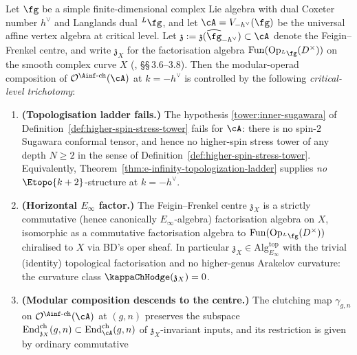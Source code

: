 \begin{theorem}
\label{thm:ff-chirhoch-critical}
Let $\fg$ be a simple finite-dimensional complex Lie algebra with
dual Coxeter number $h^\vee$ and Langlands dual ${}^L\fg$, and let
$\cA = V_{-h^\vee}(\fg)$ be the universal affine vertex algebra at
critical level. Let $\mathfrak{z} :=
\mathfrak{z}(\widehat{\fg}_{-h^\vee})
\subset \cA$ denote the Feigin--Frenkel centre, and write
$\mathfrak{z}_X$ for the factorisation algebra
$\mathrm{Fun}(\mathrm{Op}_{{}^L\fg}(D^\times))$ on the
smooth complex curve $X$ (\cite{BD04}, \S\S\,3.6--3.8). Then the
modular-operad composition of
$\mathcal{O}^{\Ainf\text{-ch}}(\cA)$ at $k=-h^\vee$ is controlled by
the following \emph{critical-level trichotomy}:
\begin{enumerate}[label=\textup{(\roman*)}]
\item \textbf{(Topologisation ladder fails.)} The hypothesis
 \ref{tower:inner-sugawara} of
 Definition~\ref{def:higher-spin-stress-tower} fails for $\cA$:
 there is no spin-$2$ Sugawara conformal tensor, and hence no
 higher-spin stress tower of any depth $N \ge 2$ in the sense of
 Definition~\ref{def:higher-spin-stress-tower}. Equivalently,
 Theorem~\ref{thm:e-infinity-topologization-ladder} supplies
 \emph{no} $\Etopo{k+2}$-structure at $k=-h^\vee$.
\item \textbf{(Horizontal $E_\infty$ factor.)} The Feigin--Frenkel
 centre $\mathfrak{z}_X$ is a strictly commutative (hence canonically
 $E_\infty$-algebra) factorisation algebra on $X$, isomorphic as a
 commutative factorisation algebra to
 $\mathrm{Fun}(\mathrm{Op}_{{}^L\fg}(D^\times))$ chiralised to $X$
 via BD's oper sheaf. In particular
 $\mathfrak{z}_X \in \mathrm{Alg}_{E_\infty}^{\mathrm{top}}$ with
 the trivial (identity) topological factorisation and no
 higher-genus Arakelov curvature: the curvature class
 $\kappaChHodge(\mathfrak{z}_X) = 0$.
\item \textbf{(Modular composition descends to the centre.)} The
 clutching map $\gamma_{g,n}$ on
 $\mathcal{O}^{\Ainf\text{-ch}}(\cA)$ at $(g,n)$ preserves the
 subspace $\mathrm{End}^{\mathrm{ch}}_{\mathfrak{z}_X}(g,n)
 \subset \mathrm{End}^{\mathrm{ch}}_{\cA}(g,n)$ of $\mathfrak{z}_X$-invariant
 inputs, and its restriction is given by ordinary commutative

\end{enumerate}
\end{theorem}
